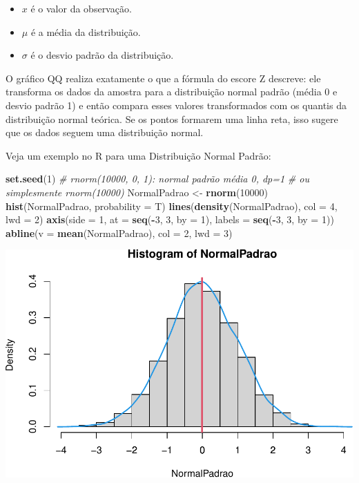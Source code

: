 \documentclass[
]{book}
\newenvironment{Shaded}{\begin{snugshade}}{\end{snugshade}}
\newcommand{\AttributeTok}[1]{\textcolor[rgb]{0.13,0.29,0.53}{#1}}
\newcommand{\CommentTok}[1]{\textcolor[rgb]{0.56,0.35,0.01}{\textit{#1}}}
\newcommand{\DecValTok}[1]{\textcolor[rgb]{0.00,0.00,0.81}{#1}}
\newcommand{\FunctionTok}[1]{\textcolor[rgb]{0.13,0.29,0.53}{\textbf{#1}}}
\newcommand{\NormalTok}[1]{#1}
\newcommand{\OtherTok}[1]{\textcolor[rgb]{0.56,0.35,0.01}{#1}}
\newcommand{\SpecialCharTok}[1]{\textcolor[rgb]{0.81,0.36,0.00}{\textbf{#1}}}
\providecommand{\tightlist}{%
  \setlength{\itemsep}{0pt}\setlength{\parskip}{0pt}}
\begin{document}
\begin{itemize}
\tightlist
\item
  \(x\) é o valor da observação.
\item
  \(\mu\) é a média da distribuição.
\item
  \(\sigma\) é o desvio padrão da distribuição.
\end{itemize}

O gráfico QQ realiza exatamente o que a fórmula do escore Z descreve: ele transforma os dados da amostra para a distribuição normal padrão (média 0 e desvio padrão 1) e então compara esses valores transformados com os quantis da distribuição normal teórica. Se os pontos formarem uma linha reta, isso sugere que os dados seguem uma distribuição normal.

Veja um exemplo no R para uma Distribuição Normal Padrão:

\begin{Shaded}
\begin{Highlighting}[]
\FunctionTok{set.seed}\NormalTok{(}\DecValTok{1}\NormalTok{)}
\CommentTok{\# rnorm(10000, 0, 1): normal padrão média 0, dp=1}
\CommentTok{\# ou simplesmente rnorm(10000)}
\NormalTok{NormalPadrao }\OtherTok{\textless{}{-}} \FunctionTok{rnorm}\NormalTok{(}\DecValTok{10000}\NormalTok{)}
\FunctionTok{hist}\NormalTok{(NormalPadrao, }\AttributeTok{probability =}\NormalTok{ T)}
\FunctionTok{lines}\NormalTok{(}\FunctionTok{density}\NormalTok{(NormalPadrao), }\AttributeTok{col =} \DecValTok{4}\NormalTok{, }\AttributeTok{lwd =} \DecValTok{2}\NormalTok{)}
\FunctionTok{axis}\NormalTok{(}\AttributeTok{side =} \DecValTok{1}\NormalTok{, }\AttributeTok{at =} \FunctionTok{seq}\NormalTok{(}\SpecialCharTok{{-}}\DecValTok{3}\NormalTok{, }\DecValTok{3}\NormalTok{, }\AttributeTok{by =} \DecValTok{1}\NormalTok{), }\AttributeTok{labels =} \FunctionTok{seq}\NormalTok{(}\SpecialCharTok{{-}}\DecValTok{3}\NormalTok{, }\DecValTok{3}\NormalTok{, }\AttributeTok{by =} \DecValTok{1}\NormalTok{))}
\FunctionTok{abline}\NormalTok{(}\AttributeTok{v =} \FunctionTok{mean}\NormalTok{(NormalPadrao), }\AttributeTok{col =} \DecValTok{2}\NormalTok{, }\AttributeTok{lwd =} \DecValTok{3}\NormalTok{)}
\end{Highlighting}
\end{Shaded}

\includegraphics{LivroEstatisticaR_files/figure-latex/unnamed-chunk-32-1.pdf}
\end{document}
